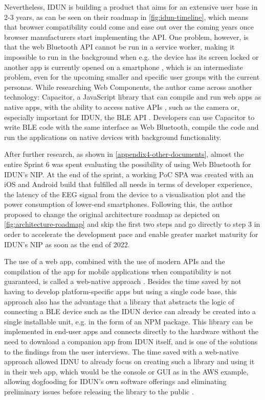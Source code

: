 Nevertheless, IDUN is building a product that aims for an extensive user base in 2-3 years, as can be seen on their roadmap in \autoref{fig:idun-timeline}, which means that browser compatibility could come and ease out over the coming years once browser manufacturers start implementing the API. One problem, however, is that the web Bluetooth API cannot be run in a service worker, making it impossible to run in the background when e.g. the device has its screen locked or another app is currently opened on a smartphone \citep{webbluetoothcg_service_2018}, which is an intermediate problem, even for the upcoming smaller and specific user groups with the current personas. While researching Web Components, the author came across another technology: Capacitor, a JavaScript library that can compile and run web apps as native apps, with the ability to access native APIs \citep{ionic_capacitor_nodate}, such as the camera or, especially important for IDUN, the BLE API \citep{capacitor-community_capacitor-communitybluetooth-_2022}. Developers can use Capacitor to write BLE code with the same interface as Web Bluetooth, compile the code and run the applications on native devices with background functionality.

After further research, as shown in \autoref{appendix4-other-documents}, almost the entire Sprint 6 was spent evaluating the possibility of using Web Bluetooth for IDUN's NIP. At the end of the sprint, a working PoC SPA was created with an iOS and Android build that fulfilled all needs in terms of developer experience, the latency of the EEG signal from the device to a visualisation plot and the power consumption of lower-end smartphones. Following this, the author proposed to change the original architecture roadmap as depicted on \autoref{fig:architecture-roadmap} and skip the first two steps and go directly to step 3 in order to accelerate the development pace and enable greater market maturity for IDUN's NIP as soon as the end of 2022.

The use of a web app, combined with the use of modern APIs and the compilation of the app for mobile applications when compatibility is not guaranteed, is called a web-native approach \citep{ionic_web_nodate}. Besides the time saved by not having to develop platform-specific apps but using a single code base, this approach also has the advantage that a library that abstracts the logic of connecting a BLE device such as the IDUN device can already be created into a single installable unit, e.g. in the form of an NPM package. This library can be implemented in end-user apps and connects directly to the hardware without the need to download a companion app from IDUN itself, and is one of the solutions to the findings from the user interviews. The time saved with a web-native approach allowed IDNU to already focus on creating such a library and using it in their web app, which would be the console or GUI as in the AWS example, allowing dogfooding for IDUN's own software offerings and eliminating preliminary issues before releasing the library to the public \citep{techopedia_what_2016}.

